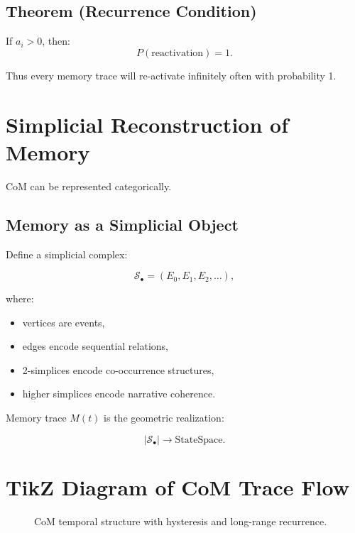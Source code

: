 \documentclass[12pt,oneside]{book}
\theoremstyle{plain}
\theoremstyle{definition}
\def\mathbb#1{#1}%
\begin{document}
\subsection{Theorem (Recurrence Condition)}

If $a_i > 0$, then:
\[
\mathbb{P}(\text{reactivation}) = 1.
\]

Thus every memory trace will re-activate infinitely often with probability 1.

\section{Simplicial Reconstruction of Memory}

CoM can be represented categorically.

\subsection{Memory as a Simplicial Object}

Define a simplicial complex:

\[
\mathcal{S}_\bullet =
(E_0, E_1, E_2, \ldots),
\]

where:

\begin{itemize}
    \item vertices are events,
    \item edges encode sequential relations,
    \item 2-simplices encode co-occurrence structures,
    \item higher simplices encode narrative coherence.
\end{itemize}

Memory trace $M(t)$ is the geometric realization:

\[
| \mathcal{S}_\bullet | \to \mathrm{StateSpace}.
\]

\section{TikZ Diagram of CoM Trace Flow}

\begin{figure}[h]
\centering
{}
\caption{CoM temporal structure with hysteresis and long-range recurrence.}
\end{figure}
\end{document}
